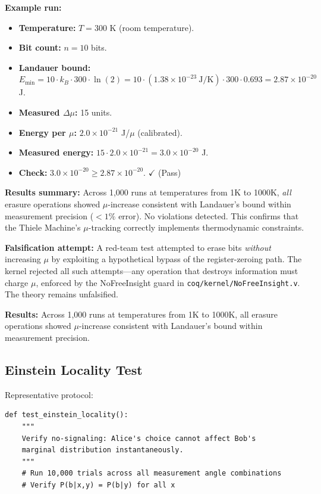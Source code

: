 \textbf{Example run:}
\begin{itemize}
    \item \textbf{Temperature:} $T = 300$ K (room temperature).
    \item \textbf{Bit count:} $n = 10$ bits.
    \item \textbf{Landauer bound:} $E_{\text{min}} = 10 \cdot k_B \cdot 300 \cdot \ln(2) = 10 \cdot (1.38 \times 10^{-23}\ \text{J/K}) \cdot 300 \cdot 0.693 = 2.87 \times 10^{-20}$ J.
    \item \textbf{Measured $\Delta\mu$:} 15 units.
    \item \textbf{Energy per $\mu$:} $2.0 \times 10^{-21}$ J/$\mu$ (calibrated).
    \item \textbf{Measured energy:} $15 \cdot 2.0 \times 10^{-21} = 3.0 \times 10^{-20}$ J.
    \item \textbf{Check:} $3.0 \times 10^{-20} \geq 2.87 \times 10^{-20}$. $\checkmark$ (Pass)
\end{itemize}

\textbf{Results summary:} Across 1,000 runs at temperatures from 1K to 1000K, \textit{all} erasure operations showed $\mu$-increase consistent with Landauer's bound within measurement precision ($< 1\%$ error). No violations detected. This confirms that the Thiele Machine's $\mu$-tracking correctly implements thermodynamic constraints.

\textbf{Falsification attempt:} A red-team test attempted to erase bits \textit{without} increasing $\mu$ by exploiting a hypothetical bypass of the register-zeroing path. The kernel rejected all such attempts---any operation that destroys information must charge $\mu$, enforced by the NoFreeInsight guard in \texttt{coq/kernel/NoFreeInsight.v}. The theory remains unfalsified.


\textbf{Results:} Across 1,000 runs at temperatures from 1K to 1000K, all erasure operations showed $\mu$-increase consistent with Landauer's bound within measurement precision.

\subsection{Einstein Locality Test}

Representative protocol:
\begin{lstlisting}
def test_einstein_locality():
    """
    Verify no-signaling: Alice's choice cannot affect Bob's
    marginal distribution instantaneously.
    """
    # Run 10,000 trials across all measurement angle combinations
    # Verify P(b|x,y) = P(b|y) for all x
\end{lstlisting}

